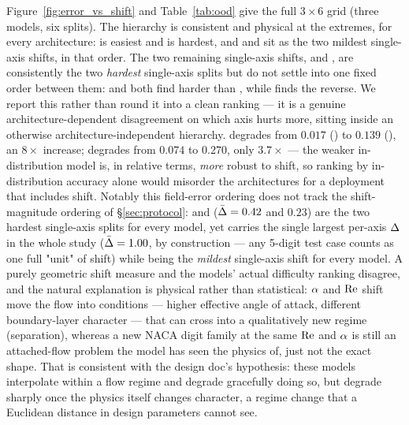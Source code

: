 \documentclass[11pt,a4paper]{article}
\begin{document}
Figure~\ref{fig:error_vs_shift} and Table~\ref{tab:ood} give the full
$3\times6$ grid (three models, six splits). The hierarchy is consistent and
physical at the extremes, for every architecture:  is easiest
and  is hardest, and  and
 sit as the two mildest single-axis shifts, in that order.
The two remaining single-axis shifts,  and ,
are consistently the two \emph{hardest} single-axis splits but do not settle
into one fixed order between them: \Mfno{} and \Mtrans{} both find
 harder than , while \Mgnn{} finds the
reverse. We report this rather than round it into a clean ranking --- it is a
genuine architecture-dependent disagreement on which axis hurts more, sitting
inside an otherwise architecture-independent hierarchy. \Mtrans{} degrades from
$0.017$ () to $0.139$ (), an
$8\times$ increase; \Mgnn{} degrades from $0.074$ to $0.270$, only $3.7\times$
--- the weaker in-distribution model is, in relative terms, \emph{more} robust
to shift, so ranking by in-distribution accuracy alone would misorder the
architectures for a deployment that includes shift. Notably this field-error
ordering does not track the shift-magnitude ordering of \S\ref{sec:protocol}:
 and  ($\bar{\Delta} = 0.42$ and $0.23$) are
the two hardest single-axis splits for every model, yet 
carries the single largest per-axis $\Delta$ in the whole study ($\bar{\Delta} =
1.00$, by construction --- any 5-digit test case counts as one full "unit" of
shift) while being the \emph{mildest} single-axis shift for every model. A
purely geometric shift measure and the models' actual difficulty ranking
disagree, and the natural explanation is physical rather than statistical:
$\alpha$ and $\mathrm{Re}$ shift move the flow into conditions --- higher effective
angle of attack, different boundary-layer character --- that can cross into a
qualitatively new regime (separation), whereas a new NACA digit family at the
same $\mathrm{Re}$ and $\alpha$ is still an attached-flow problem the model has seen the
physics of, just not the exact shape. That is consistent with the design doc's
hypothesis: these models interpolate within a flow regime and degrade
gracefully doing so, but degrade sharply once the physics itself changes
character, a regime change that a Euclidean distance in design parameters
cannot see. 
\end{document}
